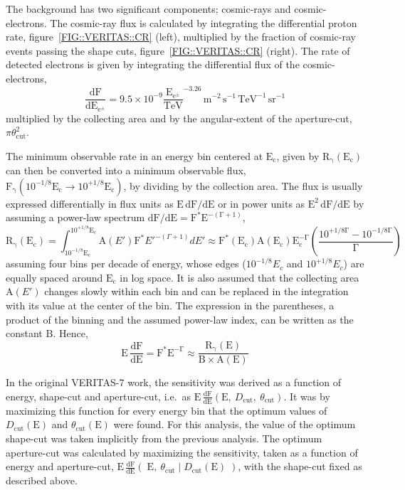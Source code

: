 The background has two significant components; cosmic-rays and
cosmic-electrons. The cosmic-ray flux is calculated by integrating the
differential proton rate, figure~\ref{FIG::VERITAS::CR} (left),
multiplied by the fraction of cosmic-ray events passing the shape
cuts, figure~\ref{FIG::VERITAS::CR} (right). The rate of detected
electrons is given by integrating the differential flux of the
cosmic-electrons,
\[\mathrm{\frac{dF}{dE_{e^{\pm}}}=9.5\times10^{-9}\frac{E_{e^{\pm}}}{TeV}^{-3.26}\,m^{-2}\,s^{-1}\,TeV^{-1}\,sr^{-1}}\] 
multiplied by the \Gray collecting area and by the angular-extent of
the aperture-cut, $\pi\theta_\mathrm{cut}^2$.

The minimum observable rate in an energy bin centered at
$\mathrm{E_c}$, given by $\mathrm{R_\gamma(E_c)}$ can then be
converted into a minimum observable flux,
$\mathrm{F_\gamma(10^{-1/8}E_c\rightarrow 10^{+1/8}E_c)}$, by dividing
by the \Gray collection area. The flux is usually expressed
differentially in flux units as $\mathrm{E\,dF/dE}$ or in power units
as $\mathrm{E^2\,dF/dE}$ by assuming a power-law spectrum
$\mathrm{dF/dE=F^*E^{-(\Gamma+1)}}$,
\[\mathrm{R_\gamma(E_c)} = 
\int_{10^{-1/8}\mathrm{E_c}}^{10^{+1/8}\mathrm{E_c}}
\mathrm{A}(E')\mathrm{F}^*E'^{-(\Gamma+1)}dE' \approx
\mathrm{F^*(E_c)A(E_c)E_c^{-\Gamma}
\left(\frac{10^{+1/8\Gamma}-10^{-1/8\Gamma}}{\Gamma}\right) }\] 
assuming four bins per decade of energy, whose edges ($10^{-1/8}E_c$
and $10^{+1/8}E_c$) are equally spaced around $\mathrm{E_c}$ in log
space. It is also assumed that the collecting area $\mathrm{A}(E')$
changes slowly within each bin and can be replaced in the integration
with its value at the center of the bin. The expression in the
parentheses, a product of the binning and the assumed power-law index,
can be written as the constant $\mathrm{B}$. Hence,
\[\mathrm{E\,\frac{dF}{dE}=F^*E^{-\Gamma}\approx 
\frac{R_\gamma(E)}{B \times A(E)}}\]

In the original VERITAS-7 work, the sensitivity was derived as a
function of energy, shape-cut and aperture-cut, i.e.\ as
$\mathrm{E\,\frac{dF}{dE}}(\mathrm{E},~D_{\mathrm{cut}},
~\theta_{\mathrm{cut}})$. It was by maximizing this function for every
energy bin that the optimum values of $D_{\mathrm{cut}}(\mathrm{E})$
and $\theta_{\mathrm{cut}}(\mathrm{E})$ were found. For this analysis,
the value of the optimum shape-cut was taken implicitly from the
previous analysis.  The optimum aperture-cut was calculated by
maximizing the sensitivity, taken as a function of energy and
aperture-cut, $\mathrm{E\,\frac{dF}{dE}}(\;\mathrm{E},
~\theta_{\mathrm{cut}}\;|\;D_{\mathrm{cut}}(\mathrm{E})\;)$, with the
shape-cut fixed as described above.

